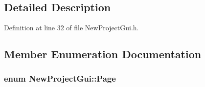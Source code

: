 \subsection{Detailed Description}


Definition at line 32 of file New\-Project\-Gui.\-h.



\subsection{Member Enumeration Documentation}
\hypertarget{class_new_project_gui_a7dd25d019611ddc0fd2b357e0f3a446c}{
\subsubsection[{Page}]{\setlength{\rightskip}{0pt plus 5cm}enum {\bf New\-Project\-Gui\-::\-Page}\hspace{0.3cm}{\ttfamily [private]}}}\label{class_new_project_gui_a7dd25d019611ddc0fd2b357e0f3a446c}
